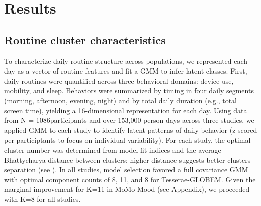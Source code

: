 \documentclass[pdflatex,sn-vancouver,Numbered]{bst/sn-jnl}%
\theoremstyle{thmstyleone}%
\theoremstyle{thmstyletwo}%
\theoremstyle{thmstylethree}%
\newcommand{\totalN}{N = 1086}   %
\begin{document}
\section*{Results}\label{sec:results}  

\subsection*{Routine cluster characteristics}\label{sec:results:cluster}

To characterize daily routine structure across populations, we represented each day as a vector of routine features and fit a GMM to infer latent classes. First, daily routines were quantified across three behavioral domains: device use, mobility, and sleep. Behaviors were summarized by timing in four daily segments (morning, afternoon, evening, night) and by total daily duration (e.g., total screen time), yielding a 16-dimensional representation for each day. Using data from \totalN participants and over 153,000 person-days across three studies, we applied GMM to each study to identify latent patterns of daily behavior (z-scored per participtants to focus on individual variability). For each study, the optimal cluster number was determined from model fit indices and the average Bhattycharya distance between clusters: higher distance suggests better clusters separation (see ). In all studies, model selection favored a full covariance GMM with optimal component counts of 8, 11, and 8 for Tesserae-GLOBEM. Given the marginal improvement for K=11 in MoMo-Mood (see Appendix), we proceeded with K=8 for all studies.
\end{document}
